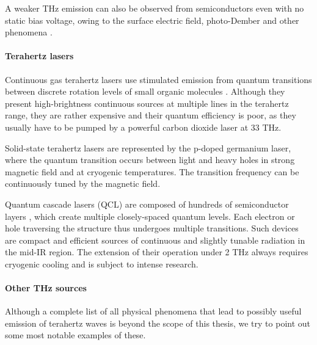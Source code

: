 A weaker THz emission can also be observed from semiconductors even with no static bias voltage, owing to the surface electric field, photo-Dember and other phenomena \cite{corchia2001effects, heyman2001terahertz}.

\paragraph{Terahertz lasers}%
Continuous gas terahertz lasers use stimulated emission from quantum transitions between discrete rotation levels of small organic molecules \cite{chang1970cw}. Although they present high-brightness continuous sources at multiple lines in the terahertz range, they are rather expensive and their quantum efficiency is poor, as they usually have to be pumped by a powerful carbon dioxide laser at 33 THz.

Solid-state terahertz lasers are represented by the p-doped germanium laser, where the quantum transition occurs between light and heavy holes in strong magnetic field and at cryogenic temperatures. The transition frequency can be continuously tuned by the magnetic field.

Quantum cascade lasers (QCL) are composed of hundreds of semiconductor layers \cite{yin2012terahertz}, which create multiple closely-spaced quantum levels. Each electron or hole traversing the structure thus undergoes multiple transitions. Such devices are compact and  efficient sources of continuous and slightly tunable radiation in the mid-IR region. The extension of their operation under 2 THz always requires cryogenic cooling and is subject to intense research.
\paragraph{Other THz sources}%
Although a complete list of all physical phenomena that lead to possibly useful emission of terahertz waves is beyond the scope of this thesis, we try to point out some most notable examples of these. 


